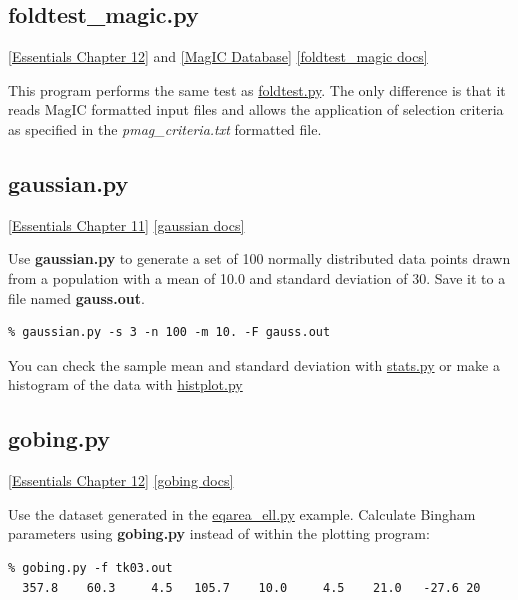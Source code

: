 \documentclass[11pt]{book}
\begin{document}
{{\subsection{foldtest\_magic.py} \href{http://earthref.org/MAGIC/books/Tauxe/Essentials/WebBook3ch12.html#ch12}{[Essentials Chapter 12]} and \href{#MagICDatabase}{[MagIC Database]}
\href{https://github.com/PmagPy/PmagPy/blob/master/programs/foldtest_magic.py}{[foldtest\_magic docs]}

This program performs the same test as \href{#foldtest.py}{foldtest.py}.  The only difference is that it reads MagIC formatted input files and allows the application of selection criteria as specified in the {\it pmag\_criteria.txt} formatted file.
%
%
\subsection{gaussian.py}
 \href{http://earthref.org/MAGIC/books/Tauxe/Essentials/WebBook3ch11.html#ch11}{[Essentials Chapter 11]}
 \href{https://github.com/PmagPy/PmagPy/blob/master/programs/gaussian.py}{[gaussian docs]}


Use {\bf gaussian.py} to generate a set of 100 normally distributed data points drawn from a population with a mean of 10.0  and   standard deviation of 30.  Save it to a file named {\bf gauss.out}.

\begin{verbatim}
% gaussian.py -s 3 -n 100 -m 10. -F gauss.out
\end{verbatim}

You can check the sample mean and standard deviation with \href{#stats.py}{stats.py} or make a histogram of the data with \href{#hisplot.py}{histplot.py}




\subsection{gobing.py}
 \href{http://earthref.org/MAGIC/books/Tauxe/Essentials/WebBook3ch11.html#ch11}{[Essentials Chapter 12]}
 \href{https://github.com/PmagPy/PmagPy/blob/master/programs/gobing.py}{[gobing docs]}

Use the dataset generated in the \href{#eqarea_ell.py}{eqarea\_ell.py} example.   Calculate Bingham parameters using {\bf gobing.py}  instead of within the plotting program:

\begin{verbatim}
% gobing.py -f tk03.out
  357.8    60.3     4.5   105.7    10.0     4.5    21.0   -27.6 20
\end{verbatim}

}}
\end{document}
